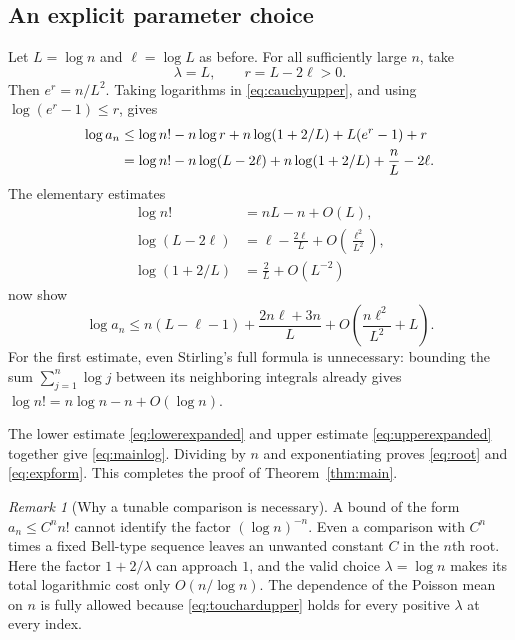 \documentclass[11pt]{article}
\numberwithin{equation}{section}
\theoremstyle{definition}
\theoremstyle{remark}
\newtheorem{remark}[theorem]{Remark}
\begin{document}
\subsection{An explicit parameter choice}

Let $L=\log n$ and $\ell=\log L$ as before. For all sufficiently large
$n$, take
\begin{equation}\label{eq:parameters}
 \lambda=L,\qquad r=L-2\ell>0.
\end{equation}
Then $e^r=n/L^2$. Taking logarithms in \eqref{eq:cauchyupper}, and using
$\log(e^r-1)\le r$, gives
\begin{align}
 \log a_n
 &\le \log n!-n\log r
       +n\log(1+2/L)
       +L(e^r-1)+r\notag\\
 &=\log n!-n\log(L-2\ell)
       +n\log(1+2/L)+\frac nL-2\ell.\label{eq:explicitupperlog}
\end{align}
The elementary estimates
\begin{align*}
 \log n!&=nL-n+O(L),\\
 \log(L-2\ell)&=\ell-\frac{2\ell}{L}
                         +O\!\left(\frac{\ell^2}{L^2}\right),\\
 \log(1+2/L)&=\frac2L+O(L^{-2})
\end{align*}
now show
\begin{equation}\label{eq:upperexpanded}
 \log a_n\le n(L-\ell-1)
     +\frac{2n\ell+3n}{L}
     +O\!\left(\frac{n\ell^2}{L^2}+L\right).
\end{equation}
For the first estimate, even Stirling's full formula is unnecessary:
bounding the sum $\sum_{j=1}^n\log j$ between its neighboring integrals
already gives $\log n!=n\log n-n+O(\log n)$.

The lower estimate \eqref{eq:lowerexpanded} and upper estimate
\eqref{eq:upperexpanded} together give \eqref{eq:mainlog}. Dividing by
$n$ and exponentiating proves \eqref{eq:root} and \eqref{eq:expform}.
This completes the proof of Theorem~\ref{thm:main}.

\begin{remark}[Why a tunable comparison is necessary]
A bound of the form $a_n\le C^n n!$ cannot identify the factor
$(\log n)^{-n}$. Even a comparison with $C^n$ times a fixed Bell-type
sequence leaves an unwanted constant $C$ in the $n$th root. Here the
factor $1+2/\lambda$ can approach $1$, and the valid choice
$\lambda=\log n$ makes its total logarithmic cost only $O(n/\log n)$.
The dependence of the Poisson mean on $n$ is fully allowed because
\eqref{eq:touchardupper} holds for every positive $\lambda$ at every
index.
\end{remark}
\end{document}
